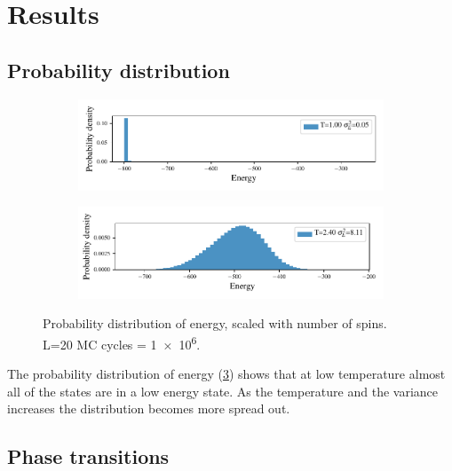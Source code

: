 \section{Results}




\subsection{Probability distribution}

\begin{figure}[ht]
  \begin{subfigure}[t]{\textwidth} %
    \centering
    \includegraphics[width=\linewidth]{../figures/distribution_0.pdf}
    \caption{}
    \label{fig:sub-first}
  \end{subfigure}
  \hfill
  \newline
  \begin{subfigure}[t]{\textwidth}
    \centering
    \includegraphics[width=\linewidth]{../figures/distribution_5.pdf}
    \caption{}
    \label{fig:sub-second}
  \end{subfigure}
  \label{fig:distribution}
  \caption{Probability distribution of energy, scaled with number of spins. L=20
  MC cycles = \num{1e6}.}
\end{figure}


The probability distribution of energy (\cref{fig:distribution}) shows that
at low temperature almost all of the states are in a low energy state.
As the temperature and the variance increases the distribution becomes more
spread out.






\subsection{Phase transitions}

